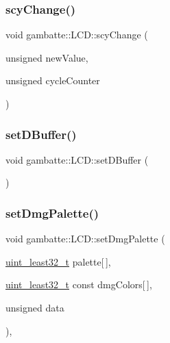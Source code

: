 \mbox{\label{classgambatte_1_1LCD_a50d315bf6aa30e6405fa0c9ff92494f2}} 
\subsubsection{\texorpdfstring{scy\+Change()}{scyChange()}}
{\footnotesize\ttfamily void gambatte\+::\+L\+C\+D\+::scy\+Change (\begin{DoxyParamCaption}\item[{unsigned}]{new\+Value,  }\item[{unsigned}]{cycle\+Counter }\end{DoxyParamCaption})}

\mbox{\label{classgambatte_1_1LCD_ae5c61529e58c19d39ba733be1872ff08}} 
\subsubsection{\texorpdfstring{set\+D\+Buffer()}{setDBuffer()}}
{\footnotesize\ttfamily void gambatte\+::\+L\+C\+D\+::set\+D\+Buffer (\begin{DoxyParamCaption}{ }\end{DoxyParamCaption})\hspace{0.3cm}{\ttfamily [private]}}

\mbox{\label{classgambatte_1_1LCD_a27c9be6c44120651147cfbf1f549bf82}} 
\subsubsection{\texorpdfstring{set\+Dmg\+Palette()}{setDmgPalette()}}
{\footnotesize\ttfamily void gambatte\+::\+L\+C\+D\+::set\+Dmg\+Palette (\begin{DoxyParamCaption}\item[{\hyperlink{namespacegambatte_a0639f09fccfbbd5a8e0796318768e370}{uint\+\_\+least32\+\_\+t}}]{palette\mbox{[}$\,$\mbox{]},  }\item[{\hyperlink{namespacegambatte_a0639f09fccfbbd5a8e0796318768e370}{uint\+\_\+least32\+\_\+t} const}]{dmg\+Colors\mbox{[}$\,$\mbox{]},  }\item[{unsigned}]{data }\end{DoxyParamCaption})\hspace{0.3cm}{\ttfamily [static]}, {\ttfamily [private]}}

